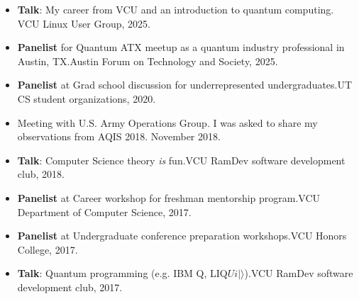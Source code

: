 \documentclass[11pt,letterpaper,serif]{moderncv}
\begin{document}
\begin{itemize}
	\item[\textbullet] \textbf{Talk}: My career from VCU and an introduction to quantum computing. \quad VCU Linux User Group, 2025.
	\item[\textbullet] \textbf{Panelist} for Quantum ATX meetup as a quantum industry professional in Austin, TX.\quad Austin Forum on Technology and Society, 2025.
	\item[\textbullet] \textbf{Panelist} at Grad school discussion for underrepresented undergraduates.\quad UT CS student organizations, 2020.
	\item[\textbullet] Meeting with U.S. Army Operations Group. I was asked to share my observations from AQIS 2018. November 2018.
	\item[\textbullet] \textbf{Talk}: Computer Science theory \emph{is} fun.\quad VCU RamDev software development club, 2018.
	\item[\textbullet] \textbf{Panelist} at Career workshop for freshman mentorship program.\quad VCU Department of Computer Science, 2017.
	\item[\textbullet] \textbf{Panelist} at Undergraduate conference preparation workshops.\quad VCU Honors College, 2017.
	\item[\textbullet] \textbf{Talk}: Quantum programming (e.g. IBM Q, LIQ$Ui|\rangle$).\quad VCU RamDev software development club, 2017.
\end{itemize}
\end{document}
